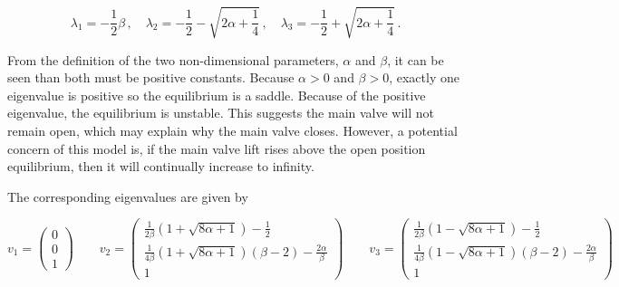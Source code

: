 \begin{equation*}
\lambda_1 = - \frac{1}{2} \beta \, , \quad
\lambda_2 = - \frac{1}{2} - \sqrt{2 \alpha + \frac{1}{4}} \, , \quad \lambda_3 = - \frac{1}{2} + \sqrt{2 \alpha + \frac{1}{4}} \, .
\end{equation*}

From the definition of the two non-dimensional parameters, $\alpha$ and $\beta$, it can be seen than both must be positive constants. Because $\alpha > 0$ and $\beta > 0$, exactly one eigenvalue is positive so the equilibrium is a saddle. Because of the positive eigenvalue, the equilibrium is unstable. This suggests the main valve will not remain open, which may explain why the main valve closes. However, a potential concern of this model is, if the main valve lift rises above the open position equilibrium, then it will continually increase to infinity.

The corresponding eigenvalues are given by

\begin{equation*}
    v_1 = \begin{pmatrix}
    0 \\ 0 \\ 1
    \end{pmatrix} \qquad
    v_2 = \begin{pmatrix}
    \frac{1}{2\beta} \left( 1 + \sqrt{8\alpha+1} \right) - \frac{1}{2} \\ \frac{1}{4\beta} \left( 1 + \sqrt{8\alpha+1} \right) \left( \beta - 2 \right) - \frac{2\alpha}{\beta} \\ 1
    \end{pmatrix} \qquad
    v_3 = \begin{pmatrix}
    \frac{1}{2\beta} \left( 1 - \sqrt{8\alpha+1} \right) - \frac{1}{2} \\ \frac{1}{4\beta} \left( 1 - \sqrt{8\alpha+1} \right) \left( \beta - 2 \right) - \frac{2\alpha}{\beta} \\ 1
    \end{pmatrix}
\end{equation*}

\newpage
